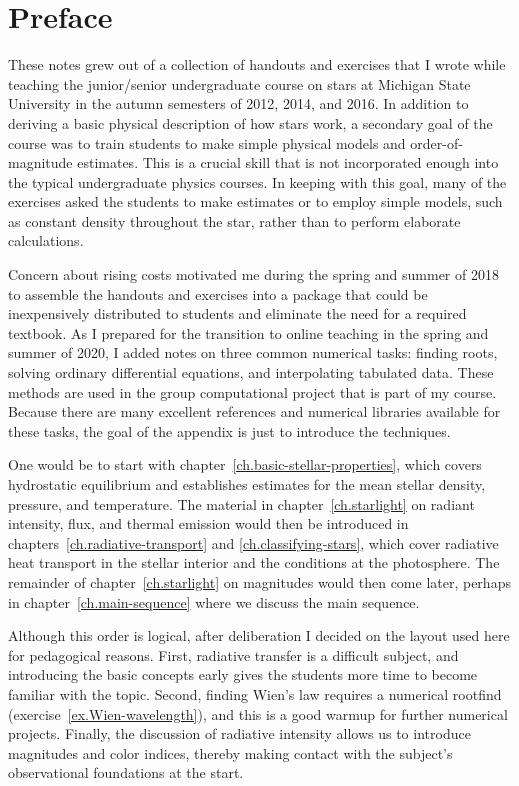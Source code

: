 
\section*{Preface}
These notes grew out of a collection of handouts and exercises that I wrote while teaching the junior/senior undergraduate course on stars at Michigan State University in the autumn semesters of 2012, 2014, and 2016. In addition to deriving a basic physical description of how stars work, a secondary goal of the course was to train students to make simple physical models and order-of-magnitude estimates. This is a crucial skill that is not incorporated enough into the typical undergraduate physics courses. In keeping with this goal, many of the exercises asked the students to make estimates or to employ simple models, such as constant density throughout the star, rather than to perform elaborate calculations.

Concern about rising costs motivated me during the spring and summer of 2018 to assemble the handouts and exercises into a package that could be inexpensively distributed to students and eliminate the need for a required textbook. As I prepared for the transition to online teaching in the spring and summer of 2020, I added notes on three common numerical tasks: finding roots, solving ordinary differential equations, and interpolating tabulated data. These methods are used in the group computational project that is part of my course. Because there are many excellent references and numerical libraries available for these tasks, the goal of the appendix is just to introduce the techniques.

 One would be to start with chapter~\ref{ch.basic-stellar-properties}, which covers hydrostatic equilibrium and establishes estimates for the mean stellar density, pressure, and temperature. The material in chapter~\ref{ch.starlight} on radiant intensity, flux, and thermal emission would then be introduced in chapters~\ref{ch.radiative-transport} and \ref{ch.classifying-stars}, which cover radiative heat transport in the stellar interior and the conditions at the photosphere. The remainder of chapter~\ref{ch.starlight} on magnitudes would then come later, perhaps in chapter~\ref{ch.main-sequence} where we discuss the main sequence.

Although this order is logical, after deliberation I decided on the layout used here for pedagogical reasons. First, radiative transfer is a difficult subject, and introducing the basic concepts early gives the students more time to become familiar with the topic. Second, finding Wien's law requires a numerical rootfind (exercise~\ref{ex.Wien-wavelength}), and this is a good warmup for further numerical projects. Finally, the discussion of radiative intensity allows us to introduce magnitudes and color indices, thereby making contact with the subject's observational foundations at the start.

